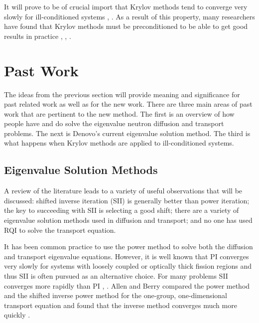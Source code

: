 It will prove to be of crucial import that Krylov methods tend to converge very slowly for ill-conditioned systems \cite{Trefethen1997}, \cite{Paige2006}. As a result of this property, many researchers have found that Krylov methods must be preconditioned to be able to get good results in practice \cite{Saad1986}, \cite{Knoll2004}, \cite{Trefethen1997}. 

\section{Past Work}
The ideas from the previous section will provide meaning and significance for past related work as well as for the new work. %
There are three main areas of past work that are pertinent to the new method. The first is an overview of how people have and do solve the eigenvalue neutron diffusion and transport problems. The next is Denovo's current eigenvalue solution method. The third is what happens when Krylov methods are applied to ill-conditioned systems.

\subsection{Eigenvalue Solution Methods}
A review of the literature leads to a variety of useful observations that will be discussed: shifted inverse iteration (SII) is generally better than power iteration; the key to succeeding with SII is selecting a good shift; there are a variety of eigenvalue solution methods used in diffusion and transport; and no one has used RQI to solve the transport equation.

It has been common practice to use the power method to solve both the diffusion and transport eigenvalue equations. However, it is well known that PI converges very slowly for systems with loosely coupled or optically thick fission regions and thus SII is often pursued as an alternative choice. For many problems SII converges more rapidly than PI \cite{Adams2002}, \cite{Evans2011}. Allen and Berry compared the power method and the shifted inverse power method for the one-group, one-dimensional transport equation and found that the inverse method converges much more quickly \cite{Allen2002}. 

